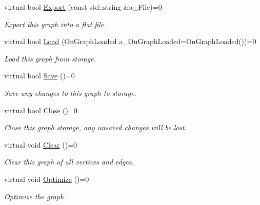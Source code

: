 \begin{DoxyCompactItemize}
virtual bool \hyperlink{class_i_graph_a6cff05100861eb3b5105437c8925d5ef}{Export} (const std\+::string \&a\+\_\+\+File)=0
\begin{DoxyCompactList}\small\item\em Export this graph into a flat file. \end{DoxyCompactList}\item 
\mbox{\label{class_i_graph_a024d07e786250889acdc71486766780e}} 
virtual bool \hyperlink{class_i_graph_a024d07e786250889acdc71486766780e}{Load} (On\+Graph\+Loaded a\+\_\+\+On\+Graph\+Loaded=On\+Graph\+Loaded())=0
\begin{DoxyCompactList}\small\item\em Load this graph from storage. \end{DoxyCompactList}\item 
\mbox{\label{class_i_graph_a2110e66013c7e121a725039e4462e330}} 
virtual bool \hyperlink{class_i_graph_a2110e66013c7e121a725039e4462e330}{Save} ()=0
\begin{DoxyCompactList}\small\item\em Save any changes to this graph to storage. \end{DoxyCompactList}\item 
\mbox{\label{class_i_graph_a5cb9e9b50a265e988ff1c6d9e28470a8}} 
virtual bool \hyperlink{class_i_graph_a5cb9e9b50a265e988ff1c6d9e28470a8}{Close} ()=0
\begin{DoxyCompactList}\small\item\em Close this graph storage, any unsaved changes will be lost. \end{DoxyCompactList}\item 
\mbox{\label{class_i_graph_ac945f9913831cd03bee19dfd55627a0e}} 
virtual void \hyperlink{class_i_graph_ac945f9913831cd03bee19dfd55627a0e}{Clear} ()=0
\begin{DoxyCompactList}\small\item\em Clear this graph of all vertices and edges. \end{DoxyCompactList}\item 
\mbox{\label{class_i_graph_a871950046092ba81c590844b98e3a5da}} 
virtual void \hyperlink{class_i_graph_a871950046092ba81c590844b98e3a5da}{Optimize} ()=0
\begin{DoxyCompactList}\small\item\em Optimize the graph. \end{DoxyCompactList}\item 

\end{DoxyCompactItemize}
